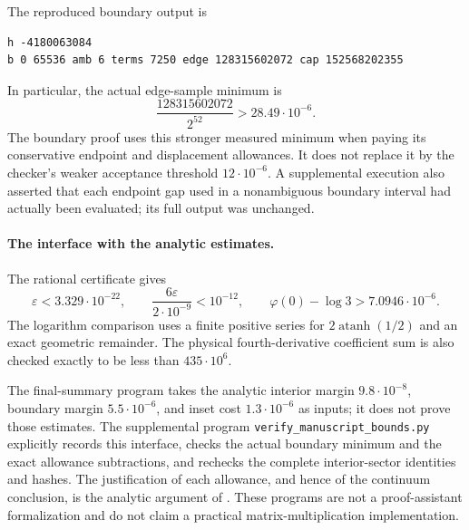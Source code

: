 \documentclass[11pt]{article}
\numberwithin{equation}{section}
\theoremstyle{definition}
\theoremstyle{remark}
\begin{document}
The reproduced boundary output is
\begin{verbatim}
h -4180063084
b 0 65536 amb 6 terms 7250 edge 128315602072 cap 152568202355
\end{verbatim}
In particular, the actual edge-sample minimum is
\[
 \frac{128315602072}{2^{52}}>28.49\cdot10^{-6}.
\]
The boundary proof uses this stronger measured minimum when paying its
conservative endpoint and displacement allowances.  It does not replace it by
the checker's weaker acceptance threshold $12\cdot10^{-6}$.
A supplemental execution also asserted that each endpoint gap used in a
nonambiguous boundary interval had actually been evaluated; its full output was
unchanged.

\paragraph{The interface with the analytic estimates.}
The rational certificate gives
\[
 \varepsilon<3.329\cdot10^{-22},\qquad
 \frac{6\varepsilon}{2\cdot10^{-9}}<10^{-12},\qquad
 \varphi(0)-\log 3>7.0946\cdot10^{-6}.
\]
The logarithm comparison uses a finite positive series for
$2\operatorname{atanh}(1/2)$ and an exact geometric remainder.
The physical fourth-derivative coefficient sum is also checked exactly to be
less than $435\cdot10^6$.

The final-summary program takes the analytic interior margin
$9.8\cdot10^{-8}$, boundary margin $5.5\cdot10^{-6}$, and inset cost
$1.3\cdot10^{-6}$ as inputs; it does not prove those estimates.  The supplemental
program \texttt{verify\_manuscript\_bounds.py} explicitly records this interface,
checks the actual boundary minimum and the exact allowance subtractions, and
rechecks the complete interior-sector identities and hashes.  The justification
of each allowance, and hence of the continuum conclusion, is the analytic
argument of .  These programs are not a proof-assistant
formalization and do not claim a practical matrix-multiplication implementation.



\end{document}
